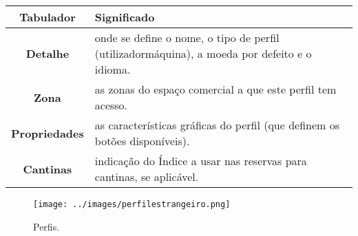 \documentclass[a4paper,11pt,openany]{memoir}
\begin{document}
 \begin{table}[ht]
 \centering
\small
\def\arraystretch{1.5}
 \begin{tabular}{c p{12cm}}  %
 \textbf{Tabulador} & \textbf{Significado}  \\ %
 \hline
\textbf{Detalhe} &  onde se define o nome, o tipo de perfil (utilizador\/máquina), a moeda por defeito e o idioma. \\
\textbf{Zona} & as zonas do espaço comercial a que este perfil tem acesso. \\
\textbf{Propriedades} &  as características gráficas do perfil (que definem os botões disponíveis). \\
\textbf{Cantinas} &  indicação do Índice a usar nas reservas para cantinas, se aplicável.\\
 \hline
 \end{tabular}
 \end{table}













\begin{figure}[h]
\begin{center}
\texttt{[image: ../images/perfilestrangeiro.png]}
\caption[Submanifold]{Perfis.}
\label{fig:perfis}
\end{center}
\end{figure}
\end{document}
